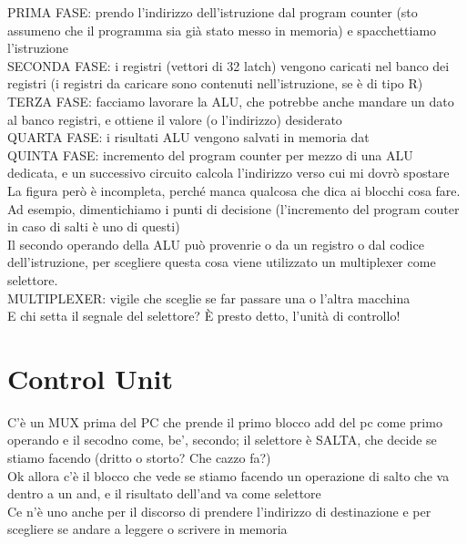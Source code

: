 \documentclass[class=book, crop=false, oneside]{standalone}
\begin{document}
PRIMA FASE: prendo l’indirizzo dell’istruzione dal program counter (sto assumeno che il programma sia già stato messo in memoria) e spacchettiamo l’istruzione\\

SECONDA FASE: i registri (vettori di 32 latch) vengono caricati nel banco dei registri (i registri da caricare sono contenuti nell’istruzione, se è di tipo R)\\

TERZA FASE: facciamo lavorare la ALU, che potrebbe anche mandare un dato al banco registri, e ottiene il valore (o l’indirizzo) desiderato\\


QUARTA FASE: i risultati ALU vengono salvati in memoria dat\\

QUINTA FASE: incremento del program counter per mezzo di una ALU dedicata, e un successivo circuito calcola l’indirizzo verso cui mi dovrò spostare\\

La  figura però è incompleta, perché manca qualcosa che dica ai blocchi cosa fare. Ad esempio, dimentichiamo i punti di decisione (l’incremento del program couter in caso di salti è uno di questi)\\

Il secondo operando della ALU può provenrie o da un registro o dal codice dell’istruzione, per scegliere questa cosa viene utilizzato un multiplexer come selettore.\\

MULTIPLEXER: vigile che sceglie se far passare una o l’altra macchina\\

E chi setta il segnale del selettore?  È presto detto, l’unità di controllo!\\
\section{Control Unit}
C’è un MUX prima del PC che prende il primo blocco add del pc come primo operando e il secodno come, be’, secondo; il selettore è SALTA, che decide se stiamo facendo (dritto o storto? Che cazzo fa?)\\

Ok allora c’è il blocco che vede se stiamo facendo un operazione di salto che va dentro a un and, e il risultato dell’and va come selettore\\

Ce n’è uno anche per il discorso di prendere l’indirizzo di destinazione e per scegliere se andare a leggere o scrivere in memoria\\
\end{document}
